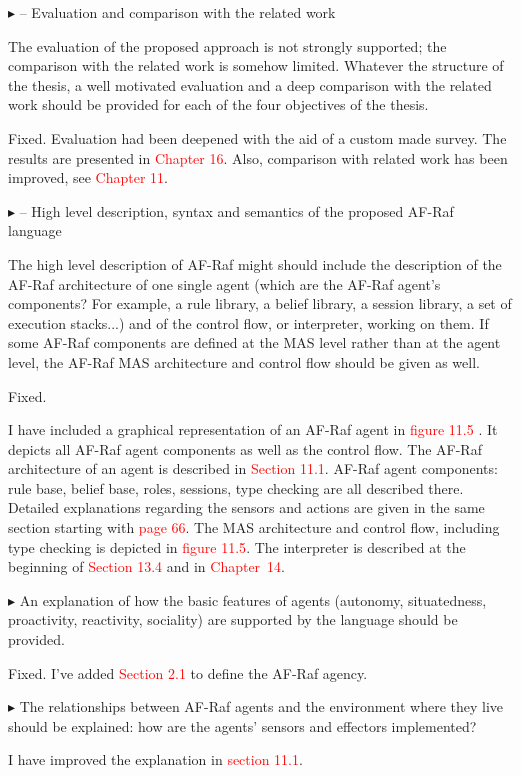 \documentclass{article}
\newcommand*\R[1]{\textcolor{red}{#1}} %
\newenvironment{them}%
  {\bigskip\noindent\begingroup\color{blue}$\blacktriangleright$\enspace}%
  {\endgroup\par}
\begin{document}
\begin{them}
-- Evaluation and comparison with the related work

The evaluation of the proposed approach is not strongly supported; the
comparison with the related work is somehow limited. Whatever the structure of
the thesis, a well motivated evaluation and a deep comparison with the related
work should be provided for each of the four objectives of the thesis.
\end{them}
Fixed. Evaluation had been deepened with the aid of a custom made survey. The
results are presented in \R{Chapter 16}. Also, comparison with related work has
been improved, see \R{Chapter 11}.

\begin{them}
-- High level description, syntax and semantics of the proposed AF-Raf language

The high level description of AF-Raf might should include the description of
the AF-Raf architecture of one single agent (which are the AF-Raf agent's
components? For example, a rule library, a belief library, a session library, a
set of execution stacks...) and of the control flow, or interpreter, working on
them. If some AF-Raf components are defined at the MAS level rather than at the
agent level, the AF-Raf MAS architecture and control flow should be given as
well.
\end{them}
Fixed.

I have included a graphical representation of an AF-Raf agent in \R{figure 11.5
}. It depicts all AF-Raf agent components as well as the control flow. The
AF-Raf architecture of an agent is described in \R{Section 11.1}. AF-Raf agent
components: rule base, belief base, roles, sessions, type checking are all
described there. Detailed explanations regarding the sensors and actions are
given in the same section starting with \R{page 66}. The MAS architecture and
control flow, including type checking is depicted in \R{figure 11.5}. The
interpreter is described at the beginning of \R{Section 13.4} and in
\R{Chapter~14}.

\begin{them}
An explanation of how the basic features of agents (autonomy, situatedness,
proactivity, reactivity, sociality) are supported by the language should be
provided. 
\end{them}
Fixed. I've added \R{Section 2.1} to define the AF-Raf agency.

\begin{them}
The relationships between AF-Raf agents and the environment where
they live should be explained: how are the agents' sensors and effectors
implemented? 
\end{them}
I have improved the explanation in \R{section 11.1}.
\end{document}
